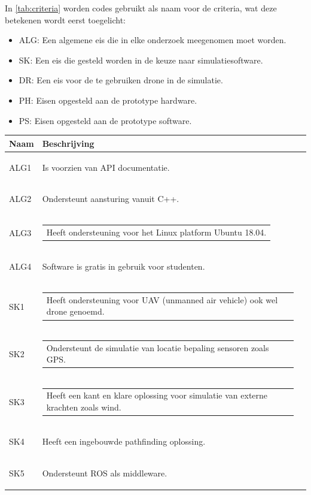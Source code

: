 \documentclass[a4paper, 11pt, oneside]{report}
\begin{document}
In \autoref{tab:criteria} worden codes gebruikt als naam voor de criteria, wat deze betekenen wordt eerst toegelicht:
\begin{itemize}
	\item ALG: Een algemene eis die in elke onderzoek meegenomen moet worden.
	\item SK: Een eis die gesteld worden in de keuze naar simulatiesoftware.
	\item DR: Een eis voor de te gebruiken drone in de simulatie.
	\item PH: Eisen opgesteld aan de prototype hardware.
	\item PS: Eisen opgesteld aan de prototype software.
\end{itemize}

\begin{longtable}{|l|l|l|}
	\hline
	\rowcolor[HTML]{C0C0C0} 
	Naam & Beschrijving \\ \hline
	\endhead
		\hypertarget{alg1}{ALG1}	&Is voorzien van API documentatie.        \\ \hline
		\hypertarget{alg2}{ALG2}	&Ondersteunt aansturing vanuit C++.    \\ \hline
		\hypertarget{alg3}{ALG3}	&\begin{tabular}[c]{@{}l@{}}Heeft ondersteuning voor het Linux platform Ubuntu 18.04.\end{tabular}        \\ \hline
		\hypertarget{alg4}{ALG4}	&Software is gratis in gebruik voor studenten.        \\ \hline
		\hypertarget{sk1}{SK1}		&\begin{tabular}[c]{@{}l@{}}Heeft ondersteuning voor UAV (unmanned air vehicle) ook wel drone genoemd.\end{tabular} \\ \hline
		\hypertarget{sk2}{SK2}		&\begin{tabular}[c]{@{}l@{}}Ondersteunt de simulatie van locatie bepaling sensoren zoals GPS.\end{tabular}        \\ \hline
		\hypertarget{sk3}{SK3}		&\begin{tabular}[c]{@{}l@{}}Heeft een kant en klare oplossing voor simulatie van externe krachten zoals wind.\end{tabular}        \\ \hline
		\hypertarget{sk4}{SK4}		& Heeft een ingebouwde pathfinding oplossing.        \\ \hline
		\hypertarget{sk5}{SK5}		& Ondersteunt ROS als middleware.        \\ \hline

\end{longtable}
\end{document}
